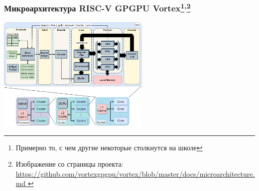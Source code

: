 \documentclass[xcolor=table,aspectratio=169]{beamer}
\begin{document}
\begin{frame}[fragile]
  \frametitle{Микроархитектура RISC-V GPGPU Vortex\footnote{Примерно то, с чем другие некоторые столкнутся на школе}\textsuperscript{,}\footnote{Изображение со страницы проекта: \url{https://github.com/vortexgpgpu/vortex/blob/master/docs/microarchitecture.md
  }}}
  \vspace{-0.7cm}
    \begin{center}
  \includegraphics[valign=t,width=0.55\textwidth]{pictures/vortex_microarchitecture.png}\\
  
\end{center}

\end{frame}
\end{document}
